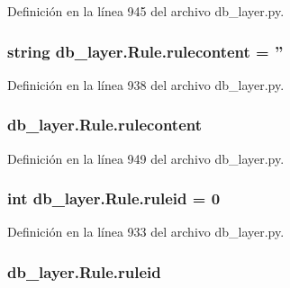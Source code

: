 Definición en la línea 945 del archivo db\-\_\-layer.\-py.

\hypertarget{classdb__layer_1_1_rule_adda2b017e49fb9e1ce8a18821062e94d}{
\subsubsection[{rulecontent}]{\setlength{\rightskip}{0pt plus 5cm}string db\-\_\-layer.\-Rule.\-rulecontent = ''\hspace{0.3cm}{\ttfamily [static]}}}\label{classdb__layer_1_1_rule_adda2b017e49fb9e1ce8a18821062e94d}


Definición en la línea 938 del archivo db\-\_\-layer.\-py.

\hypertarget{classdb__layer_1_1_rule_a818bda1ddeae841530511302a3a4d12b}{
\subsubsection[{rulecontent}]{\setlength{\rightskip}{0pt plus 5cm}db\-\_\-layer.\-Rule.\-rulecontent}}\label{classdb__layer_1_1_rule_a818bda1ddeae841530511302a3a4d12b}


Definición en la línea 949 del archivo db\-\_\-layer.\-py.

\hypertarget{classdb__layer_1_1_rule_a9826ed75d79061c3fe046e62864ffa58}{
\subsubsection[{ruleid}]{\setlength{\rightskip}{0pt plus 5cm}int db\-\_\-layer.\-Rule.\-ruleid = 0\hspace{0.3cm}{\ttfamily [static]}}}\label{classdb__layer_1_1_rule_a9826ed75d79061c3fe046e62864ffa58}


Definición en la línea 933 del archivo db\-\_\-layer.\-py.

\hypertarget{classdb__layer_1_1_rule_af82864d81aca316dcd34545f42598160}{
\subsubsection[{ruleid}]{\setlength{\rightskip}{0pt plus 5cm}db\-\_\-layer.\-Rule.\-ruleid}}\label{classdb__layer_1_1_rule_af82864d81aca316dcd34545f42598160}


